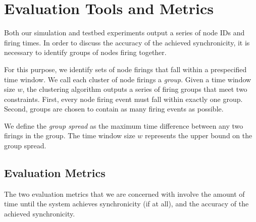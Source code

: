 \section{Evaluation Tools and Metrics}

Both our simulation and testbed experiments output a series of node
IDs and firing times. In order to discuss the accuracy of the achieved
synchronicity, it is necessary to identify groups of nodes firing
together.

For this purpose, we identify sets of node firings that fall within a
prespecified time window. We call each cluster of node firings a {\em
group}. Given a time window size $w$, the clustering algorithm outputs
a series of firing groups that meet two constraints. First, every node
firing event must fall within exactly one group.  Second, groups are
chosen to contain as many firing events as possible. 

We define the {\em group spread} as the maximum time difference
between any two firings in the group. The time window size $w$
represents the upper bound on the group spread. 

\subsection{Evaluation Metrics}

The two evaluation metrics that we are concerned with involve
the amount of time until the system achieves synchronicity (if at
all), and the accuracy of the achieved synchronicity.

